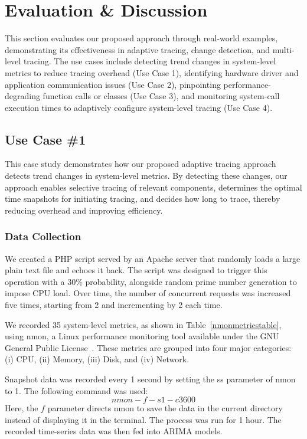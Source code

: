 \documentclass[pdflatex,sn-nature]{sn-jnl}%
\theoremstyle{thmstyleone}%
\theoremstyle{thmstyletwo}%
\theoremstyle{thmstylethree}%
\begin{document}
\section{Evaluation \& Discussion} \label{results}
This section evaluates our proposed approach through real-world examples, demonstrating its effectiveness in adaptive tracing, change detection, and multi-level tracing. The use cases include detecting trend changes in system-level metrics to reduce tracing overhead (Use Case 1), identifying hardware driver and application communication issues (Use Case 2), pinpointing performance-degrading function calls or classes (Use Case 3), and monitoring system-call execution times to adaptively configure system-level tracing (Use Case 4).

\subsection{Use Case \#1}\label{case studies & evaluation: case study 1}
This case study demonstrates how our proposed adaptive tracing approach detects trend changes in system-level metrics. By detecting these changes, our approach enables selective tracing of relevant components, determines the optimal time snapshots for initiating tracing, and decides how long to trace, thereby reducing overhead and improving efficiency.




\subsubsection{Data Collection}\label{case studies & evaluation: data collection & generation}

We created a PHP script served by an Apache server that randomly loads a large plain text file and echoes it back. The script was designed to trigger this operation with a 30\% probability, alongside random prime number generation to impose CPU load. Over time, the number of concurrent requests was increased five times, starting from 2 and incrementing by 2 each time.

We recorded 35 system-level metrics, as shown in Table~\ref{nmonmetricstable}, using nmon, a Linux performance monitoring tool available under the GNU General Public License~\cite{nmon}. These metrics are grouped into four major categories: (i) CPU, (ii) Memory, (iii) Disk, and (iv) Network.

Snapshot data was recorded every 1 second by setting the ss parameter of nmon to 1. The following command was used:
\[ nmon -f -s 1 -c 3600 \]
Here, the $f$ parameter directs nmon to save the data in the current directory instead of displaying it in the terminal. The process was run for 1 hour. The recorded time-series data was then fed into ARIMA models.
\end{document}
